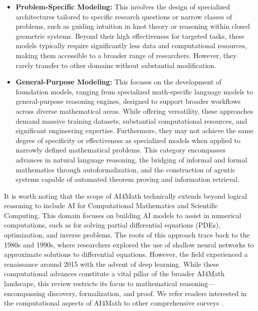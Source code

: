 \documentclass[11pt]{article}
\numberwithin{equation}{section}
\begin{document}
\begin{itemize}
    \item \textbf{Problem-Specific Modeling:} This involves the design of specialized architectures tailored to specific research questions or narrow classes of problems, such as guiding intuition in knot theory or reasoning within closed geometric systems. Beyond their high effectiveness for targeted tasks, these models typically require significantly less data and computational resources, making them accessible to a broader range of researchers. However, they rarely transfer to other domains without substantial modification.
    \item \textbf{General-Purpose Modeling:} This focuses on the development of foundation models, ranging from specialized math-specific language models to general-purpose reasoning engines, designed to support broader workflows across diverse mathematical areas. While offering versatility, these approaches demand massive training datasets, substantial computational resources, and significant engineering expertise. Furthermore, they may not achieve the same degree of specificity or effectiveness as specialized models when applied to narrowly defined mathematical problems. This category encompasses advances in natural language reasoning, the bridging of informal and formal mathematics through autoformalization, and the construction of agentic systems capable of automated theorem proving and information retrieval.
\end{itemize}

It is worth noting that the scope of AI4Math technically extends beyond logical reasoning to include AI for Computational Mathematics and Scientific Computing. This domain focuses on building AI models to assist in numerical computations, such as for solving partial differential equations (PDEs), optimization, and inverse problems. The roots of this approach trace back to the 1980s and 1990s, where researchers explored the use of shallow neural networks to approximate solutions to differential equations. However, the field experienced a renaissance around 2015 with the advent of deep learning. While these computational advances constitute a vital pillar of the broader AI4Math landscape, this review restricts its focus to mathematical reasoning—encompassing discovery, formalization, and proof. We refer readers interested in the computational aspects of AI4Math to other comprehensive surveys \cite{arridge2019solving,karniadakis2021physics,brunton2024promising,weinan2021dawning,dong2022mathematical,chen2022learning}.
\end{document}

